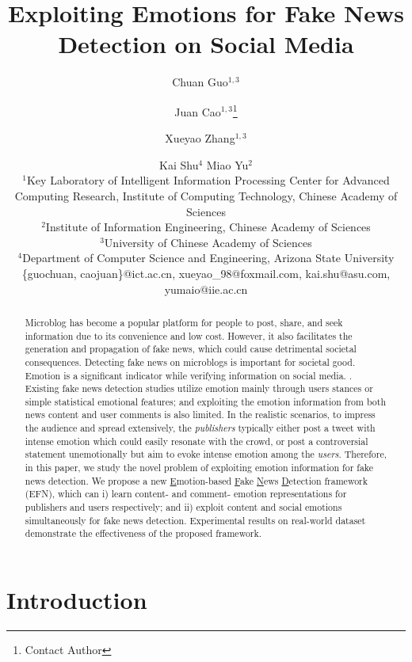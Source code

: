 \documentclass{article}
\title{Exploiting Emotions for Fake News Detection on Social Media}
\author{
	Chuan Guo$^{1,3}$\and
	Juan Cao$^{1,3}$\footnote{Contact Author}\and
	Xueyao Zhang$^{1,3}$\and
	Kai Shu$^4$\And
	Miao Yu$^{2}$\\
	\affiliations
	$^1$Key Laboratory of Intelligent Information Processing Center for Advanced Computing Research, Institute of Computing Technology, Chinese Academy of Sciences\\
	$^2$Institute of Information Engineering, Chinese Academy of Sciences\\
	$^3$University of Chinese Academy of Sciences\\
	$^4$Department of Computer Science and Engineering, Arizona State University\\
	\emails
	\{guochuan, caojuan\}@ict.ac.cn,
	xueyao\_98@foxmail.com,
	kai.shu@asu.com,
	yumaio@iie.ac.cn
}
\newcommand{\m}{EFN}
\begin{document}
	
	\maketitle
	
	\begin{abstract}
		Microblog has become a popular platform for people to post, share, and seek information due to its convenience and low cost. However, it also facilitates the generation and propagation of fake news, which could cause detrimental societal consequences. Detecting fake news on microblogs is important for societal good. Emotion is a significant indicator while verifying information on social media. . 
		Existing fake news detection studies utilize emotion mainly through users stances or simple statistical emotional features; and exploiting the emotion information from both news content and user comments is also limited. In the realistic scenarios, to impress the audience and spread extensively, the \textit{publishers} typically either post a tweet with intense emotion which could easily resonate with the crowd, or post a controversial statement unemotionally but aim to evoke intense emotion among the \textit{users}. 
		Therefore, in this paper, we study the novel problem of exploiting emotion information for fake news detection. We propose a new \underline{E}motion-based \underline{F}ake \underline{N}ews \underline{D}etection framework ({\m}), which can i) learn content- and comment- emotion representations for publishers and users respectively; and ii) exploit content and social emotions simultaneously for fake news detection. Experimental results on real-world dataset demonstrate the effectiveness of the proposed framework.
	\end{abstract}
	
	\section{Introduction}
	
\end{document}
